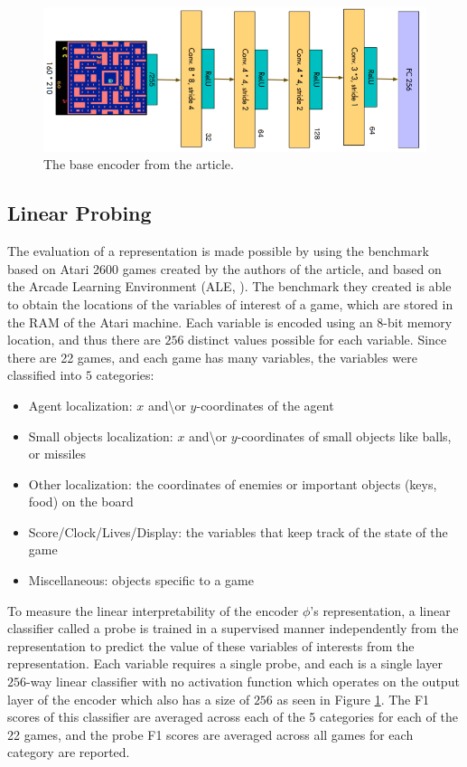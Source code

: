 \begin{figure}[H]
    \centering
    \includegraphics[width=\textwidth,height=\textheight,keepaspectratio]{../openreview/base_encoder.PNG}
    \caption{The base encoder from the article.}
    \label{fig:base-encoder-image}
\end{figure}

\subsection{Linear Probing}
The evaluation of a representation is made possible by using the benchmark based on Atari 2600 games created by the authors of the article, and based on the Arcade Learning Environment (ALE, \cite{ALE}). The benchmark they created is able to obtain the locations of the variables of interest of a game, which are stored in the RAM of the Atari machine. Each variable is encoded using an $8$-bit memory location, and thus there are $256$ distinct values possible for each variable. Since there are 22 games, and each game has many variables, the variables were classified into $5$ categories: 
\begin{itemize}
    \item Agent localization: $x$ and\textbackslash or $y$-coordinates of the agent
    \item Small objects localization: $x$ and\textbackslash or $y$-coordinates of small objects like balls, or missiles
    \item Other localization: the coordinates of enemies or important objects  (keys, food) on the board
    \item Score/Clock/Lives/Display: the variables that keep track of the state of the game
    \item Miscellaneous: objects specific to a game
\end{itemize}

To measure the linear interpretability of the encoder $\phi$'s representation, a linear classifier called a probe is trained in a supervised manner independently from the representation to predict the value of these variables of interests from the representation. Each variable requires a single probe, and each is a single layer $256$-way linear classifier with no activation function which operates on the output layer of the encoder which also has a size of $256$ as seen in Figure \ref{fig:base-encoder-image}. The F1 scores of this classifier are averaged across each of the 5 categories for each of the 22 games, and the probe F1 scores are averaged across all games for each category are reported.


